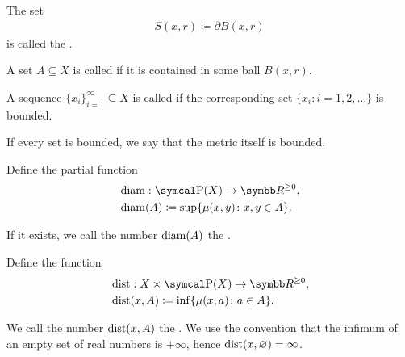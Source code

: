 \begin{definition}
\begin{defenum}
    \item\label{def:metric_space/sphere} The set
    \begin{align*}
      S(x, r) \coloneqq \partial{B(x, r)}
    \end{align*}
    is called the .

    \item\label{def:metric_space/bounded_set} A set \( A \subseteq X \) is called  if it is contained in some ball \( B(x, r) \).

    \item\label{def:metric_space/bounded_sequence} A sequence \( \{ x_i \}_{i=1}^\infty \subseteq X \) is called  if the corresponding set \( \{ x_i \colon i = 1, 2, \ldots \} \) is bounded.

    \item\label{def:metric_space/bounded_metric} If every set is bounded, we say that the metric itself is bounded.

    \item\label{def:metric_space/diameter} Define the partial function
    \begin{align*}
      &\Diam: \Power(X) \to \BB{R}^{\geq 0}, \\
      &\Diam(A) \coloneqq \sup \{ \mu(x, y) \colon x, y \in A \}.
    \end{align*}

    If it exists, we call the number \( \operatorname{diam}(A) \) the .

    \item\label{def:metric_space/distance} Define the function
    \begin{align*}
      &\Dist: X \times \Power(X) \to \BB{R}^{\geq 0}, \\
      &\Dist(x, A) \coloneqq \inf \{ \mu(x, a) \colon a \in A \}.
    \end{align*}

    We call the number \( \operatorname{dist}(x, A) \) the . We use the convention that the infimum of an empty set of real numbers is \( +\infty \), hence \( \operatorname{dist}(x, \varnothing) = \infty \).
  \end{defenum}
\end{definition}

